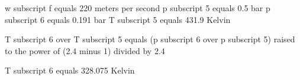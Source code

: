 w subscript f equals 220 meters per second  
p subscript 5 equals 0.5 bar  
p subscript 6 equals 0.191 bar  
T subscript 5 equals 431.9 Kelvin  

T subscript 6 over T subscript 5 equals (p subscript 6 over p subscript 5) raised to the power of (2.4 minus 1) divided by 2.4  

T subscript 6 equals 328.075 Kelvin
